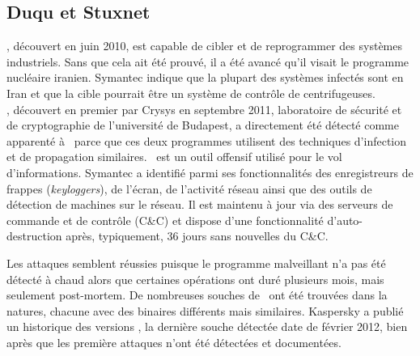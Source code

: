 \subsection{Duqu et Stuxnet}
\stux, découvert en juin 2010, est capable de cibler et de reprogrammer des systèmes industriels.
Sans que cela ait été prouvé, il a été avancé qu'il visait le programme nucléaire iranien. 
Symantec \cite{SymantecStux2011} indique que la plupart des systèmes infectés sont en Iran et que la cible pourrait être un système de contrôle de centrifugeuses.
\\

\duqu, découvert en premier par Crysys \cite{CrysysDuquStuxnet} en septembre 2011, laboratoire de sécurité et de cryptographie de l'université de Budapest, a directement été détecté comme apparenté à \stux\ parce que ces deux programmes utilisent des techniques d'infection et de propagation similaires.
\duqu\ est un outil offensif utilisé pour le vol d'informations. Symantec \cite{SymantecDuqu2011} a identifié parmi ses fonctionnalités des enregistreurs de frappes (\emph{keyloggers}), de l'écran, de l'activité réseau ainsi que des outils de détection de machines sur le réseau.
Il est maintenu à jour via des serveurs de commande et de contrôle (C\&C) et dispose d'une fonctionnalité d'auto-destruction après, typiquement, 36 jours sans nouvelles du C\&C.

Les attaques semblent réussies puisque le programme malveillant n'a pas été détecté à chaud alors que certaines opérations ont duré plusieurs mois, mais seulement post-mortem. De nombreuses souches de \duqu\ ont été trouvées dans la natures, chacune avec des binaires différents mais similaires. Kaspersky a publié un historique des versions \cite{KaspDuqu10}, la dernière souche détectée date de février 2012, bien après que les première attaques n'ont été détectées et documentées.

